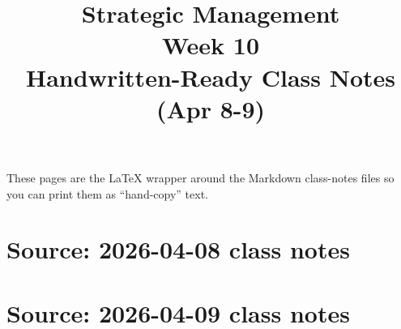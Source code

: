\documentclass[11pt,a4paper]{article}
\title{Strategic Management \\ Week 10 \\ Handwritten-Ready Class Notes (Apr 8-9)}
\author{}
\date{}
\begin{document}
\maketitle

These pages are the LaTeX wrapper around the Markdown class-notes files so you can print them as ``hand-copy'' text.

\section*{Source: 2026-04-08 class notes}

\newpage

\section*{Source: 2026-04-09 class notes}
\end{document}
